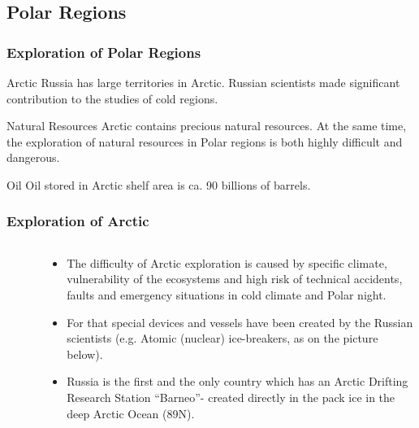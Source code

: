 \documentclass[pdflatex,compress,8pt,
	xcolor={dvipsnames,dvipsnames,svgnames,x11names,table},
	hyperref={colorlinks = true,breaklinks = true, urlcolor = NavyBlue, breaklinks = true}]{beamer}
\begin{document}
\subsection{Polar Regions}
\begin{frame}\frametitle{Exploration of Polar Regions}

\begin{alertblock}{Arctic}
Russia has large territories in Arctic. Russian scientists made significant contribution to the studies of cold regions. 
\end{alertblock}

\begin{block}{Natural Resources}
Arctic contains precious natural resources. At the same time, the exploration of natural resources in Polar regions is both highly difficult and dangerous. 
\end{block}

\begin{examples}{Oil}
Oil stored in Arctic shelf area is ca. 90 billions of barrels. 
\end{examples}
\end{frame}

\begin{frame}\frametitle{Exploration of Arctic}
\begin{minipage}[0.4\textheight]{\textwidth}
\begin{columns}[T]
\begin{column}{0.5\textwidth}
\begin{figure}[H]
	\centering
			\vspace{5mm}
\end{figure}
\end{column}
\begin{column}{0.5\textwidth}
\vspace{2em} 
\begin{itemize}
	\item The difficulty of Arctic exploration is caused by specific climate,  vulnerability of the ecosystems and high risk of technical accidents, faults and emergency situations in cold climate and Polar night. 
	\item For that special devices and vessels have been created by the Russian scientists (e.g. Atomic (nuclear) ice-breakers, as on the picture below).
	\item Russia is the first and the only country which has an Arctic Drifting Research Station “Barneo”- created directly in the pack ice in the deep Arctic Ocean (89\degree N). 
\end{itemize}
\end{column}
\end{columns}
\end{minipage}
\end{frame}
\end{document}
